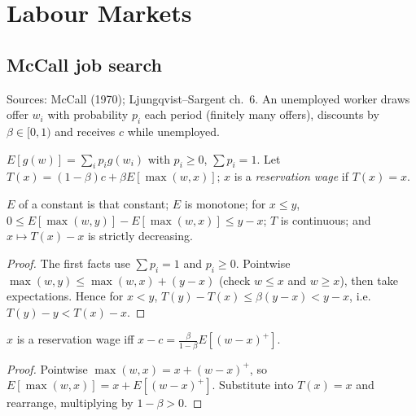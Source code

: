 \chapter{Labour Markets}
\label{chap:labor}

\section{McCall job search}
\label{sec:mccall}

Sources: McCall (1970); Ljungqvist--Sargent ch.~6. An unemployed worker draws offer $w_i$ with probability
$p_i$ each period (finitely many offers), discounts by $\beta \in [0, 1)$ and receives $c$ while unemployed.

\begin{definition}
\label{def:mccall}
\leanok
$E[g(w)] = \sum_i p_i g(w_i)$ with $p_i \ge 0$, $\sum p_i = 1$. Let $T(x) = (1-\beta)c + \beta E[\max(w, x)]$;
$x$ is a \emph{reservation wage} if $T(x) = x$.
\end{definition}

\begin{lemma}
\label{lem:mccall_T_props}
\leanok
{}
$E$ of a constant is that constant; $E$ is monotone; for $x \le y$,
$0 \le E[\max(w, y)] - E[\max(w, x)] \le y - x$; $T$ is continuous; and $x \mapsto T(x) - x$ is strictly decreasing.
\end{lemma}
\begin{proof}
\leanok
The first facts use $\sum p_i = 1$ and $p_i \ge 0$. Pointwise $\max(w, y) \le \max(w, x) + (y - x)$ (check $w \le x$
and $w \ge x$), then take expectations. Hence for $x < y$,
$T(y) - T(x) \le \beta(y - x) < y - x$, i.e.\ $T(y) - y < T(x) - x$.
\end{proof}

\begin{theorem}
\label{thm:mccall_textbook}
\leanok
{}
$x$ is a reservation wage iff $x - c = \frac{\beta}{1-\beta} E[(w - x)^+]$.
\end{theorem}
\begin{proof}
\leanok
Pointwise $\max(w, x) = x + (w - x)^+$, so $E[\max(w, x)] = x + E[(w - x)^+]$. Substitute into $T(x) = x$ and
rearrange, multiplying by $1 - \beta > 0$.
\end{proof}

